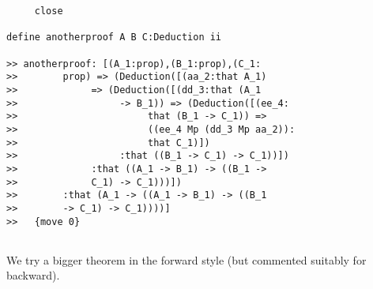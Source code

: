 \documentclass[12pt]{article}
\begin{document}
\begin{verbatim}
     close

define anotherproof A B C:Deduction ii

>> anotherproof: [(A_1:prop),(B_1:prop),(C_1:
>>        prop) => (Deduction([(aa_2:that A_1) 
>>             => (Deduction([(dd_3:that (A_1 
>>                  -> B_1)) => (Deduction([(ee_4:
>>                       that (B_1 -> C_1)) => 
>>                       ((ee_4 Mp (dd_3 Mp aa_2)):
>>                       that C_1)])
>>                  :that ((B_1 -> C_1) -> C_1))])
>>             :that ((A_1 -> B_1) -> ((B_1 -> 
>>             C_1) -> C_1)))])
>>        :that (A_1 -> ((A_1 -> B_1) -> ((B_1 
>>        -> C_1) -> C_1))))]
>>   {move 0}


\end{verbatim}

We try a bigger theorem in the forward style (but commented suitably for backward).
\end{document}
